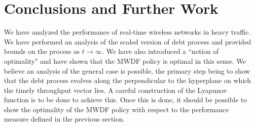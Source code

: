 \documentclass[letterpaper, 10 pt, conference]{ieeeconf}
\begin{document}
\section{Conclusions and Further Work}\label{sec:conclusion} 
 We have analyzed the performance of real-time wireless networks in heavy traffic. We have performed an analysis of the scaled version of debt process and provided bounds on the process as $t\to\infty$. We have also introduced a ``notion of optimality" and have shown that the MWDF policy is optimal in this sense. We believe an analysis of the general case is possible, the primary step being to show that the debt process evolves along the perpendicular to the hyperplane on which the timely throughput vector lies. A careful construction of the Lyapunov function is to be done to achieve this. Once this is done, it should be possible to show the optimality of the MWDF policy with respect to the performance measure defined in the previous section.












\end{document}
